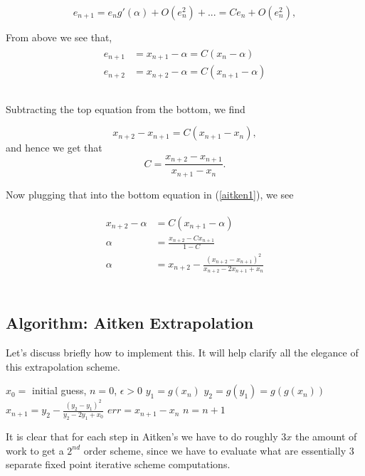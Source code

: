 \documentclass[paper=a4, fontsize=11pt]{scrartcl} %
\numberwithin{equation}{section} %
\numberwithin{figure}{section} %
\numberwithin{table}{section} %
\begin{document}
$$e_{n+1} = e_n g'(\alpha) + O(e_n^2) + ... = C e_n + O(e_n^2),$$

From above we see that, \\

\begin{align} 
\begin{split}
\label{aitken1}
e_{n+1}&= x_{n+1} - \alpha = C(x_n - \alpha) \\
e_{n+2}&= x_{n+2} - \alpha = C(x_{n+1}-\alpha) \\
\end{split}					
\end{align}\\

Subtracting the top equation from the bottom, we find 

$$x_{n+2}-x_{n+1} = C(x_{n+1}-x_n),$$ and hence we get that $$C = \frac{ x_{n+2}-x_{n+1}     }{   x_{n+1}-x_n    }.$$

Now plugging that into the bottom equation in (\ref{aitken1}), we see

\begin{align} 
\begin{split}
\label{aitken1}
x_{n+2} - \alpha &= C(x_{n+1}-\alpha) \\
\alpha &= \frac{ x_{n+2} - C x_{n+1}  }{ 1 - C  } \\
\alpha &= x_{n+2} - \frac{  (x_{n+2}-x_{n+1})^2   }{ x_{n+2}-2 x_{n+1} + x_{n}  }
\end{split}					
\end{align}\\

\subsection{Algorithm: Aitken Extrapolation}

Let's discuss briefly how to implement this. It will help clarify all the elegance of this extrapolation scheme. 

\begin{algorithmic}
\State $x_0 =$ initial guess, $n=0$, $\epsilon > 0$
\State $y_1 = g(x_n)$
\State $y_2 = g(y_1) = g(g(x_n))$
\State $x_{n+1} = y_2 - \frac{(y_2-y_1)^2}{y_2 - 2 y_1 + x_0}$
\State $err = x_{n+1}-x_{n}$
\State $n=n+1$ 
\EndWhile
\end{algorithmic}

It is clear that for each step in Aitken's we have to do roughly $3x$ the amount of work to get a $2^{nd}$ order scheme, since we have to evaluate what are essentially 3 separate fixed point iterative scheme computations. \\
\end{document}
